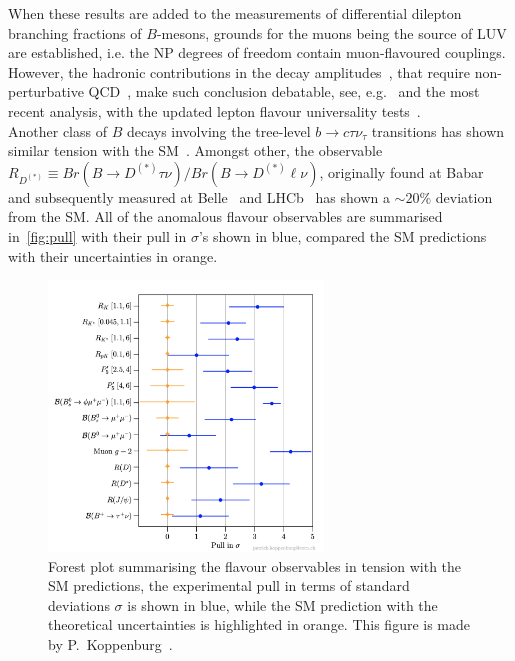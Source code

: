 When these results are added to the measurements of differential dilepton branching fractions of $B$-mesons,  grounds for the muons being the source of LUV are established, i.e. the NP degrees of freedom contain muon-flavoured couplings.  However, the hadronic contributions in the decay amplitudes~\cite{Khodjamirian:2010vf,Lyon:2014hpa,Chobanova:2017ghn,Blake:2017fyh,Bobeth:2017vxj}, that require non-perturbative QCD~\cite{Jager:2014rwa,Ciuchini:2015qxb,Arbey:2018ics,Chrzaszcz:2018yza}, make such conclusion debatable, see, e.g.~\cite{Ciuchini:2018anp,Hurth:2020rzx} and the most recent analysis, with the updated lepton flavour universality tests~\cite{Ciuchini:2021smi}. \\
Another class of $B$ decays involving the tree-level $ b \to c \tau \nu_\tau$ transitions has shown similar tension with the SM~\cite{Azatov:2018knx,Alok:2019uqc,Murgui:2019czp,Shi:2019gxi}. Amongst other, the observable $R_{D^{(*)}} \equiv Br(B \to D^{(*)} \tau \nu) / Br(B \to D^{(*)} \ell \nu)$, originally found at Babar~\cite{Lees:2013uzd} and subsequently measured at Belle~\cite{Huschle:2015rga} and LHCb~\cite{Aaij:2017uff} has shown a $\sim 20\%$ deviation from the SM. All of the anomalous flavour observables are summarised in~\autoref{fig:pull} with their pull in $\sigma$'s shown in blue, compared the SM predictions with their uncertainties in orange. \\
\begin{figure}[ht!]
	\centering
	\includegraphics[width=0.65\textwidth]{fig/pull}
	\caption{ Forest plot summarising the flavour observables in tension with the SM predictions, the experimental pull in terms of standard deviations $\sigma$ is shown in blue, while the SM prediction with the theoretical uncertainties is highlighted in orange. This figure is made by P.~Koppenburg~\cite{Koppenburg:2767155}. }
	\label{fig:pull}
\end{figure}
